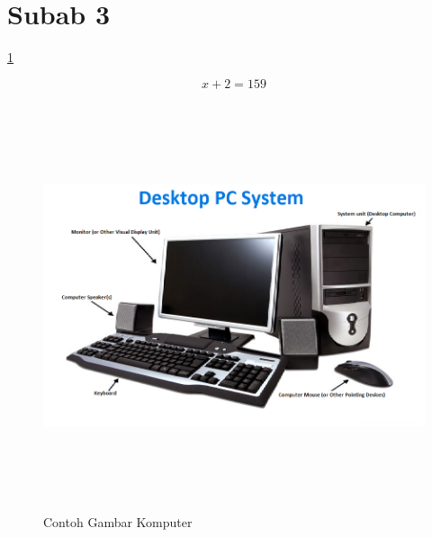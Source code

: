 	\section{Subab 3}
	\blindtext \ref{fig:komputer}

\begin{equation}
    x+2 = 159
\end{equation}
\blindtext

\begin{landscape}
   \begin{figure}[t]
        \centering
        \includegraphics[width=18cm, height=12cm]{gambar/contoh-gambar-miring.png}
        \caption{Contoh Gambar Komputer}
        \label{fig:komputer}
    \end{figure}
\end{landscape}

